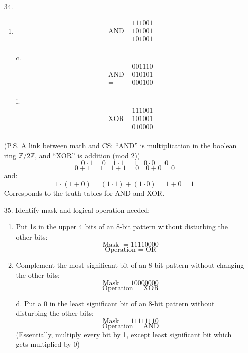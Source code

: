 \documentclass[hidelinks,12pt]{article}
\newcommand{\Z}{\mathbb{Z}}
\begin{document}
\begin{enumerate}
\begin{enumerate}
        \end{enumerate}
    \item[34.]\begin{enumerate}
            \item
                \begin{align*}
                    & 111001\\
                    \text{AND }& 101001\\
                    = & 101001\\
                \end{align*}
            \item[c.]
                \begin{align*}
                    & 001110\\
                    \text{AND }& 010101\\
                    = & 000100\\
                \end{align*}
            \item[i.]
                \begin{align*}
                    & 111001\\
                    \text{XOR }& 101001\\
                    = & 010000\\
                \end{align*}
        \end{enumerate}
        (P.S. A link between math and CS: ``AND'' is multiplication in the boolean ring $\Z/2\Z$, and ``XOR'' is addition (mod 2))
        \[0\cdot1=0\quad 1\cdot1=1\quad 0\cdot0=0\]
        \[0+1=1\quad 1+1=0\quad 0+0=0\]
        and:
        \[1\cdot(1+0)=(1\cdot1)+(1\cdot0)=1+0=1\tag{Multiplication distributes over +}\]
        Corresponds to the truth tables for AND and XOR.
    \item[35.]Identify mask and logical operation needed:
        \begin{enumerate}
            \item Put 1s in the upper 4 bits of an 8-bit pattern without disturbing the other bits:
                \[\text{Mask }=11110000\]
                \[\text{Operation = OR}\]
            \item Complement the most significant bit of an 8-bit pattern without changing the other bits:
                \[\text{Mask }=10000000\]
                \[\text{Operation = XOR}\]
            \item[d.] Put a 0 in the least significant bit of an 8-bit pattern without disturbing the other bits:
                \[\text{Mask }=11111110\]
                \[\text{Operation = AND}\]
                (Essentially, multiply every bit by 1, except least significant bit which gets multiplied by 0)
        \end{enumerate}
\end{enumerate}
\end{document}
